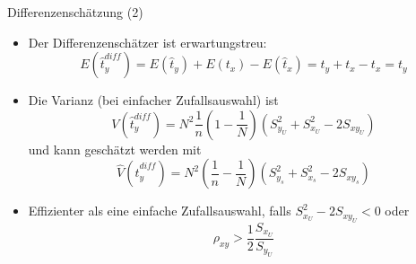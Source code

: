 \documentclass[9pt]{beamer}
\begin{document}
\begin{frame}{Differenzenschätzung (2)}
\begin{itemize}
	\item Der Differenzenschätzer ist erwartungstreu:
	$$ E(\hat{t}_y^{diff}) = E(\hat{t}_y) + E(t_x) -E(\hat{t}_x) = t_y + t_x -t_x = t_y$$
	\item Die Varianz (bei einfacher Zufallsauswahl) ist
	$$V(\hat{t}_y^{diff}) = N^2\frac{1}{n}\left(1-\frac{1}{N}\right)(S_{y_U}^2+S_{x_U}^2-2S_{xy_U})$$
	und kann geschätzt werden mit
	$$\hat{V}(\hat{t}_y^{diff}) = N^2\left(\frac{1}{n}-\frac{1}{N}\right)(S_{y_s}^2+S_{x_s}^2-2S_{xy_s})$$
	\item Effizienter als eine einfache Zufallsauswahl, falls $S_{x_U}^2 - 2 S_{xy_U}<0$ oder
	$$ \rho_{xy} > \frac{1}{2} \frac{S_{x_U}}{S_{y_U}}$$
\end{itemize}
\end{frame}
\end{document}
